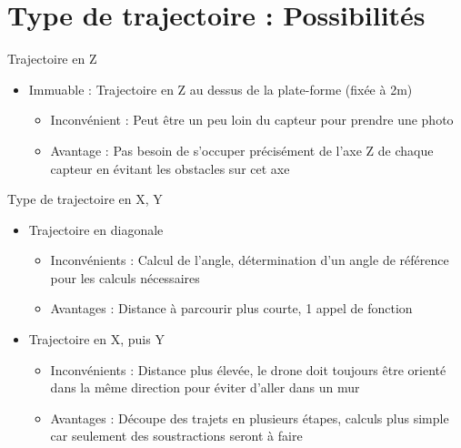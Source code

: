 \documentclass[12pt]{beamer}
\begin{document}
	\section{Type de trajectoire : Possibilités}
	\begin{frame}[allowframebreaks]
	    \begin{exampleblock}{Trajectoire en Z}
            \begin{itemize}
                [triangle]
                \item Immuable : Trajectoire en Z au dessus de la plate-forme (fixée à 2m)
                    \begin{itemize}
                        \item Inconvénient : Peut être un peu loin du capteur pour prendre une photo
                        \item Avantage : Pas besoin de s'occuper précisément de l'axe Z de chaque capteur en évitant les obstacles sur cet axe
                    \end{itemize}
            \end{itemize}
        \end{exampleblock}
        
        \begin{exampleblock}{Type de trajectoire en X, Y}
            \begin{itemize}
                [triangle]
                \item Trajectoire en diagonale
                    \begin{itemize}
                        \item Inconvénients : Calcul de l'angle, détermination d'un angle de référence pour les calculs nécessaires
                        \item Avantages : Distance à parcourir plus courte, 1 appel de fonction
                    \end{itemize}
                \item Trajectoire en X, puis Y
                    \begin{itemize}
                        \item Inconvénients : Distance plus élevée, le drone doit toujours être orienté dans la même direction pour éviter d'aller dans un mur
                        \item Avantages : Découpe des trajets en plusieurs étapes, calculs plus simple car seulement des soustractions seront à faire
                    \end{itemize}
            \end{itemize}
        \end{exampleblock}
	\end{frame}
\end{document}
